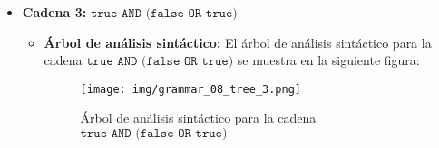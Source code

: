 \documentclass[11pt]{report}
\begin{document}
\begin{itemize}
\begin{itemize}
    \newpage

    \item \textbf{Cadena 3:} $\texttt{true AND (false OR true)}$
    \begin{itemize}
      \item \textbf{Árbol de análisis sintáctico:} El árbol de análisis sintáctico para la cadena $\texttt{true AND}$ $\texttt{(false OR true)}$ se muestra en la siguiente figura:
      \begin{figure}[H]
        \centering
        \texttt{[image: img/grammar\_08\_tree\_3.png]}
        \caption{Árbol de análisis sintáctico para la cadena $\texttt{true AND (false OR true)}$}
        \label{fig:arbol24}
      \end{figure}
    \end{itemize}
  \end{itemize}
\end{itemize}

\newpage
\end{document}
